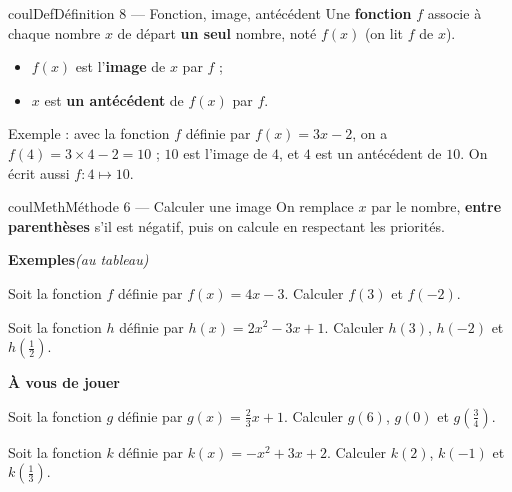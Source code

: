 \documentclass[11pt,a4paper]{article}
\makeatletter
\newcounter{lycee@signet}
\newcommand{\signet}[3][]{\stepcounter{lycee@signet}%
  \edef\lycee@dest{\if\relax\detokenize{#1}\relax
    signet.\arabic{lycee@signet}\else#1\fi}%
  \hypertarget{\lycee@dest}{}\bookmark[level=#2,dest=\lycee@dest]{#3}}
\newcounter{methode}
\newenvironment{definitionbox}[1][Définition]%
  {\begin{boitecours}[phantom={\signet{2}{#1}}]{coulDef}{#1}}{\end{boitecours}}
\newenvironment{methodebox}[1][Méthode]{\stepcounter{methode}%
  \begin{boitecours}[phantom={\signet[methode-\arabic{methode}]{2}{#1}}]{coulMeth}{#1}}%
  {\end{boitecours}}
\newcommand{\etape}[1]{\par\smallskip\textbf{\color{coulMeth}#1}\par\nobreak\smallskip}
\newcommand{\autableau}{\hfill{\footnotesize\itshape\color{black!45}(au tableau)}}
\newcommand{\etapeexemples}{%
    \par\smallskip\textbf{\color{coulMeth}Exemples}\autableau\par\nobreak\smallskip}
\makeatother
\begin{document}
\begin{definitionbox}[Définition 8 --- Fonction, image, antécédent]
Une \textbf{fonction} $f$ associe à chaque nombre $x$ de départ \textbf{un seul} nombre,
noté $f(x)$ (on lit \og $f$ de $x$\fg{}).
\begin{itemize}
  \item $f(x)$ est l'\textbf{image} de $x$ par $f$ ;
  \item $x$ est \textbf{un antécédent} de $f(x)$ par $f$.
\end{itemize}
\begin{center}
\end{center}
Exemple : avec la fonction $f$ définie par $f(x)=3x-2$, on a $f(4)=3\times 4-2=10$ ; $10$ est l'image de $4$, et $4$
est un antécédent de $10$. On écrit aussi $f : 4\longmapsto 10$.
\end{definitionbox}

\begin{methodebox}[Méthode 6 --- Calculer une image]
On remplace $x$ par le nombre, \textbf{entre parenthèses} s'il est négatif, puis on
calcule en respectant les priorités.
\etapeexemples
\begin{questions}[label=\alph*)]
  \item Soit la fonction $f$ définie par ${f(x)=4x-3}$. Calculer $f(3)$ et $f(-2)$.
  \item Soit la fonction $h$ définie par ${h(x)=2x^{2}-3x+1}$. Calculer $h(3)$, $h(-2)$ et $h\!\left(\frac12\right)$.
\end{questions}

\etape{À vous de jouer}
\begin{questions}
  \item Soit la fonction $g$ définie par ${g(x)=\frac23x+1}$. Calculer $g(6)$, $g(0)$ et $g\!\left(\frac34\right)$.
  \item Soit la fonction $k$ définie par ${k(x)=-x^{2}+3x+2}$. Calculer $k(2)$, $k(-1)$ et $k\!\left(\frac13\right)$.
\end{questions}

\end{methodebox}
\end{document}
